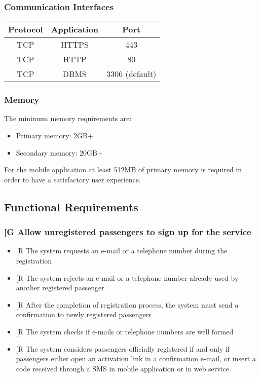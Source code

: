 \documentclass[a4paper,12pt]{article}%
\newcounter{goals_counter}
\newcounter{func_req_counter}
\begin{document}
\subsubsection{Communication Interfaces}
\begin{center}
\begin{tabular}{|c|c|c|}
\hline
Protocol & Application & Port \\
\hline \hline
TCP & HTTPS & 443 \\
\hline
TCP & HTTP & 80 \\
\hline
TCP & DBMS & 3306 (default) \\
\hline
\end{tabular}
\end{center}
\subsubsection{Memory}
The minimum memory requirements are:
\begin{itemize}
\item Primary memory: 2GB+
\item Secondary memory: 20GB+
\end{itemize}
For the mobile application at least 512MB of primary memory is required in order to have a satisfactory user experience.
\subsection{Functional Requirements}
\setcounter{goals_counter}{1}
\subsubsection{\label{goal\arabic{goals_counter}}{[}G\arabic{goals_counter}{]} Allow unregistered passengers to sign up for the service}
\begin{itemize}
\item {[}R\arabic{func_req_counter}{]} The system requests an e-mail or a telephone number during the registration
\item {[}R\arabic{func_req_counter}{]} The system rejects an e-mail or a telephone number already used by another registered passenger
\item {[}R\arabic{func_req_counter}{]} After the completion of registration process, the system must send a confirmation to newly registered passengers
\item {[}R\arabic{func_req_counter}{]} The system checks if e-mails or telephone numbers are well formed
\item {[}R\arabic{func_req_counter}{]} The system considers passengers officially registered if and only if passengers either open an activation link in a confirmation e-mail, or insert a code received through a SMS in mobile application or in web service.
\end{itemize}
\setcounter{func_req_counter}{1}
\end{document}
